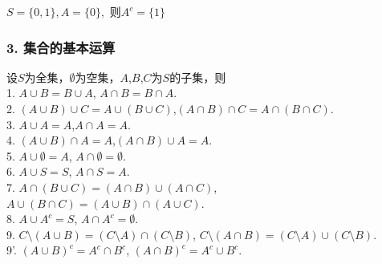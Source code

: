 \documentclass{beamer}
\begin{document}
\begin{CJK*}{UTF8}{gbsn}
\begin{frame}
\begin{minipage}{0.69\linewidth}
\begin{Def}
  \end{Def}\pause
\end{minipage}
\begin{minipage}{0.29\linewidth}
  \end{minipage}\pause
    \begin{Ex}
        $S = \{0,1\}, A =  \{0\},$ 则$A^c = \{1\}$
    \end{Ex}
\end{frame}


\begin{frame}
  \frametitle{3. 集合的基本运算}
  \begin{Thm}
设$S$为全集，$\emptyset$为空集，$A$,$B$,$C$为$S$的子集，则\\
1. $A \cup B = B \cup A$, $A \cap B = B \cap A$.\\
2. $(A \cup B) \cup C = A \cup (B \cup C)$,$(A \cap B) \cap C = A \cap (B \cap C)$.\\
3. $A \cup A = A$,$A \cap A = A$.\\
4. $(A \cup B) \cap A = A$,$(A \cap B) \cup A = A$.\\
5. $A \cup \emptyset = A$, $A \cap \emptyset = \emptyset$.\\
6. $A \cup S = S$, $A \cap S = A$.\\
7. $A \cap (B \cup C) = (A \cap B) \cup (A \cap C)$, $A \cup (B \cap C) = (A \cup B) \cap (A \cup C)$.\\
8. $A \cup A^c = S$, $A \cap A^c = \emptyset$.\\
9. $C\setminus (A \cup B) = (C \setminus A) \cap (C \setminus B)$, $C \setminus (A \cap B) = (C \setminus A) \cup (C \setminus B)$.\\ 
9'. $(A \cup B)^c = A^c \cap B^c$, $(A \cap B)^c = A^c \cup B^c$.\\
  \end{Thm}
\end{frame}


\end{CJK*}
\end{document}
